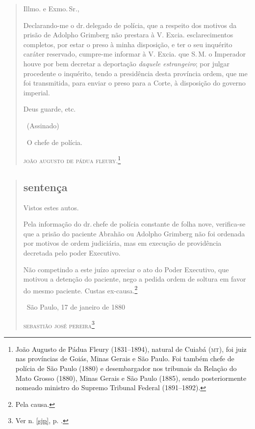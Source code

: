 {\asterisc

\pagebreak
\begin{quote}
Illmo. e Exmo.\,Sr.,

Declarando-me o dr.\,delegado de polícia, que a respeito dos motivos da
prisão de Adolpho Grimberg não prestara à V. Excia. esclarecimentos
completos, por estar o preso à minha disposição, e ter o seu inquérito
caráter reservado, cumpre-me informar à V. Excia. que S.\,M. o Imperador
houve por bem decretar a deportação \emph{daquele estrangeiro}; por
julgar procedente o inquérito, tendo a presidência desta província
ordem, que me foi transmitida, para enviar o preso para a Corte, à
disposição do governo imperial.

Deus guarde, etc.\medskip

\hfill\ (Assinado)

\hfill\ O chefe de polícia.

\hfill\textsc{joão augusto de pádua fleury}.\footnote{João Augusto de Pádua Fleury
  (1831--1894), natural de Cuiabá (\textsc{mt}), foi juiz nas províncias de Goiás,
  Minas Gerais e São Paulo. Foi também chefe de polícia de São Paulo
  (1880) e desembargador nos tribunais da Relação do Mato Grosso (1880),
  Minas Gerais e São Paulo (1885), sendo posteriormente nomeado ministro
  do Supremo Tribunal Federal (1891--1892).}
\end{quote}  


\begin{quote}
\subsection{sentença}

Vistos estes autos.

Pela informação do dr.\,chefe de polícia constante de folha nove,
verifica-se que a prisão do paciente Abrahão ou Adolpho Grimberg não foi
ordenada por motivos de ordem judiciária, mas em execução de providência
decretada pelo poder Executivo.

Não competindo a este juízo apreciar o ato do Poder Executivo, que
motivou a detenção do paciente, nego a pedida ordem de soltura em favor
do mesmo paciente. Custas ex-causa.\footnote{Pela causa.}\medskip

\hfill\ São Paulo, 17 de janeiro de 1880

\hfill\textsc{sebastião josé pereira}\footnote{Ver n. \ref{sjp}, p. \pageref{sjp}.}
\end{quote}

}
